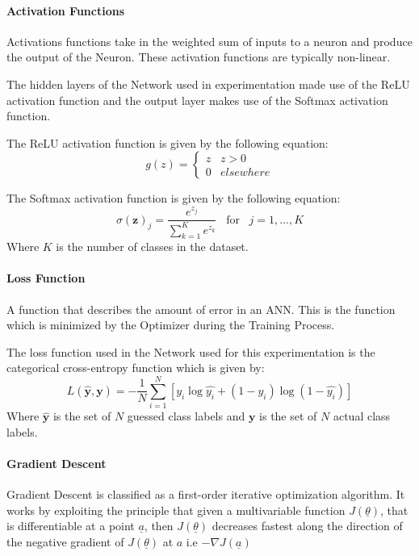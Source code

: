 \documentclass{article}
\begin{document}
\paragraph{Activation Functions}
Activations functions take in the weighted sum of inputs to a neuron and produce the output of the Neuron. These activation functions are typically non-linear.

The hidden layers of the Network used in experimentation made use of the ReLU activation function and the output layer makes use of the Softmax activation function.

The ReLU activation function is given by the following equation:
\begin{equation}
g(z) = \begin{cases} 
z & z > 0 \\
0 & elsewhere
\end{cases}
\end{equation}

The Softmax activation function is given by the following equation:
\begin{equation}
\sigma(\boldsymbol{z})_j = \frac{e^{z_j}}{\sum_{k=1}^{K} e^{z_{k}}} \;\;\; \mbox{for} \;\;\; j = 1, ... , K 
\end{equation}
Where $K$ is the number of classes in the dataset.


\paragraph{Loss Function}
A function that describes the amount of error in an ANN. This is the function which is minimized by the Optimizer during the Training Process.

The loss function used in the Network used for this experimentation is the categorical cross-entropy function which is given by:
\begin{equation}
	L(\hat{\boldsymbol{y}},\boldsymbol{y}) = -\frac{1}{N}\sum_{i=1}^{N} [y_{i}\log{\hat{y_{i}}} + (1-y_{i})\log{(1 - \hat{y_{i}})}]
\end{equation}
Where $\hat{\boldsymbol{y}}$ is the set of $N$ guessed class labels and $\boldsymbol{y}$ is the set of $N$ actual class labels.
\paragraph{Gradient Descent}
Gradient Descent is classified as a first-order iterative optimization algorithm. It works by exploiting the principle that given a multivariable function $J(\underline\theta)$, that is differentiable at a point $\underline{a}$, then $J(\underline\theta)$ decreases fastest along the direction of the negative gradient of $J(\underline\theta)$ at $a$ i.e $-\nabla{J(\underline{a})}$
 
\end{document}
